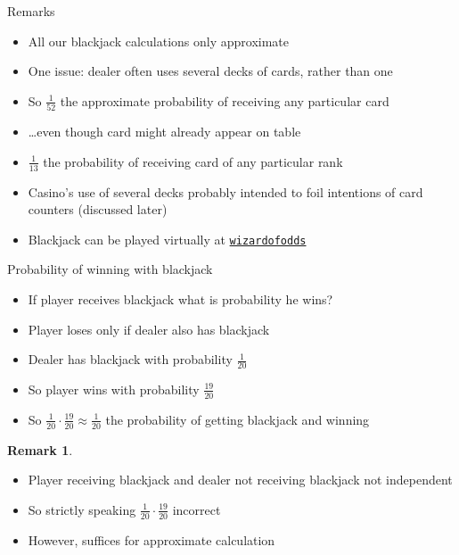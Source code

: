 \documentclass{beamer}
\theoremstyle{definition}
\newtheorem{remark}{Remark}
\begin{document}
\begin{frame}{Remarks}
\begin{itemize}
\item All our blackjack calculations only approximate
\item One issue: dealer often uses several decks of cards, rather than one
\item So $\frac{1}{52}$ the
approximate probability of receiving any particular card
\item \dots even though card might already appear on table
\item $\frac{1}{13}$ the probability of receiving card
of any particular rank
\item Casino's use of several decks probably intended to foil
intentions of \alert{card counters} (discussed later)
\item Blackjack can be played virtually at
\href{http://wizardofodds.com/play/blackjack}{\color{blue}\tt wizardofodds}
\end{itemize}
\end{frame}

\begin{frame}{Probability of winning with blackjack}
\begin{itemize}
\item If player receives blackjack
what is probability he wins?
\item Player loses only if dealer also has blackjack
\item Dealer has blackjack with probability $\textstyle\frac{1}{20}$
\item So player wins with probability $\textstyle\frac{19}{20}$
\item So $\frac{1}{20}\cdot\frac{19}{20}
\approx\frac{1}{20}$ the probability of getting blackjack and winning
\end{itemize}
\begin{remark}
\begin{itemize}
\item Player receiving blackjack and dealer not receiving blackjack
not independent
\item So strictly speaking 
$\frac{1}{20}\cdot\frac{19}{20}$ incorrect
\item However, suffices for approximate calculation
\end{itemize}
\end{remark}
\end{frame}
\end{document}
